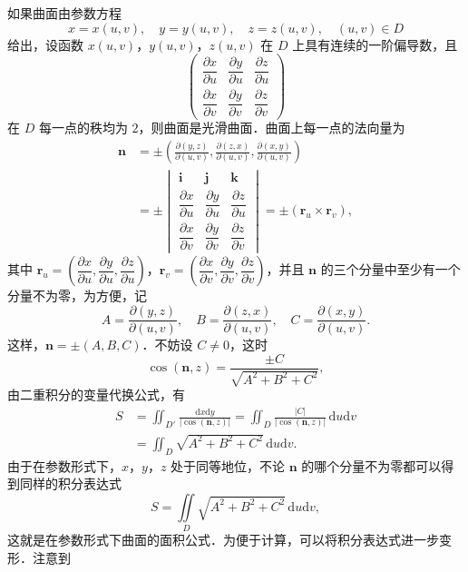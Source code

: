 如果曲面由参数方程
\[
x=x(u,v),\quad y=y(u,v),\quad z=z(u,v),\quad(u,v)\in D
\]
给出，设函数 $x(u,v)$，$y(u,v)$，$z(u,v)$ 在 $D$ 上具有连续的一阶偏导数，且
\[
\begin{pmatrix}
\dfrac{\partial x}{\partial u} & \dfrac{\partial y}{\partial u} & \dfrac{\partial z}{\partial u}\\[6pt]
\dfrac{\partial x}{\partial v} & \dfrac{\partial y}{\partial v} & \dfrac{\partial z}{\partial v}
\end{pmatrix}
\]
在 $D$ 每一点的秩均为 $2$，则曲面是光滑曲面．曲面上每一点的法向量为
\[
\begin{aligned}
\bm{n}&=\pm\left(\frac{\partial(y,z)}{\partial(u,v)},\frac{\partial(z,x)}{\partial(u,v)},\frac{\partial(x,y)}{\partial(u,v)}\right)\\
&=\pm\begin{vmatrix}
\bm{i} & \bm{j} & \bm{k}\\
\dfrac{\partial x}{\partial u} & \dfrac{\partial y}{\partial u} & \dfrac{\partial z}{\partial u}\\[6pt]
\dfrac{\partial x}{\partial v} & \dfrac{\partial y}{\partial v} & \dfrac{\partial z}{\partial v}
\end{vmatrix}=\pm\left(\bm{r}_{u}\times\bm{r}_{v}\right),
\end{aligned}
\]
其中 $\bm{r}_{u}=\left(\dfrac{\partial x}{\partial u},\dfrac{\partial y}{\partial u},\dfrac{\partial z}{\partial u}\right)$，$\bm{r}_{v}=\left(\dfrac{\partial x}{\partial v},\dfrac{\partial y}{\partial v},\dfrac{\partial z}{\partial v}\right)$，并且 $\bm{n}$ 的三个分量中至少有一个分量不为零，为方便，记
\[
A=\frac{\partial(y,z)}{\partial(u,v)},\quad B=\frac{\partial(z,x)}{\partial(u,v)},\quad C=\frac{\partial(x,y)}{\partial(u,v)}.
\]
这样，$\bm{n}=\pm(A,B,C)$．不妨设 $C\neq 0$，这时
\[
\cos(\bm{n},z)=\frac{\pm C}{\sqrt{A^{2}+B^{2}+C^{2}}},
\]
由二重积分的变量代换公式，有
\[
\begin{aligned}
S&=\iint_{D'}\frac{\mathrm{d}x\mathrm{d}y}{\left|\cos(\bm{n},z)\right|}=\iint_{D}\frac{\left|C\right|}{\left|\cos(\bm{n},z)\right|}\,\mathrm{d}u\mathrm{d}v\\
&=\iint_{D}\sqrt{A^{2}+B^{2}+C^{2}}\,\mathrm{d}u\mathrm{d}v.
\end{aligned}
\]
由于在参数形式下，$x$，$y$，$z$ 处于同等地位，不论 $\bm{n}$ 的哪个分量不为零都可以得到同样的积分表达式
\[
S=\iint\limits_{D}\sqrt{A^{2}+B^{2}+C^{2}}\,\mathrm{d}u\mathrm{d}v,
\]
这就是在参数形式下曲面的面积公式．为便于计算，可以将积分表达式进一步变形．注意到
